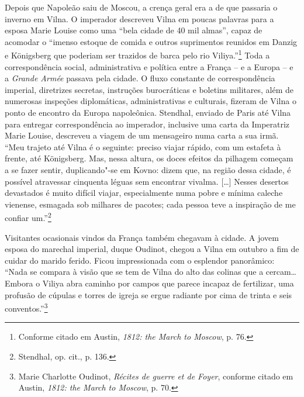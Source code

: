 Depois que Napoleão saiu de Moscou, a crença geral era a de que passaria
o inverno em Vilna. O imperador descreveu Vilna em poucas palavras para
a esposa Marie Louise como uma ``bela cidade de 40 mil almas'', capaz de
acomodar o ``imenso estoque de comida e outros suprimentos reunidos em
Danzig e Königsberg que poderiam ser trazidos de barca pelo
rio Viliya.''\footnote{Conforme citado em Austin, \textit{1812: the March to Moscow}, p. 76.} Toda a correspondência social, administrativa e política entre a França -- e a Europa -- e a \textit{Grande
Armée} passava pela cidade. O fluxo constante de correspondência
imperial, diretrizes secretas, instruções burocráticas e boletins
militares, além de numerosas inspeções diplomáticas, administrativas e
culturais, fizeram de Vilna o ponto de encontro da Europa napoleônica.
Stendhal, enviado de Paris até Vilna para entregar correspondência ao
imperador, inclusive uma carta da Imperatriz Marie Louise, descreveu a
viagem de um mensageiro numa carta a sua irmã. ``Meu trajeto até Vilna é
o seguinte: preciso viajar rápido, com um estafeta à frente, até
Königsberg. Mas, nessa altura, os doces efeitos da pilhagem começam a se
fazer sentir, duplicando"-se em Kovno: dizem que, na região dessa cidade,
é possível atravessar cinquenta léguas sem encontrar vivalma. [\ldots{}]
Nesses desertos devastados é muito difícil viajar, especialmente numa
pobre e mínima caleche vienense, esmagada sob milhares de pacotes; cada
pessoa teve a inspiração de me confiar um.''\footnote{Stendhal, op. cit., p. 136.}

Visitantes ocasionais vindos da França também chegavam à cidade. A jovem
esposa do marechal imperial, duque Oudinot, chegou a Vilna em outubro a
fim de cuidar do marido ferido. Ficou impressionada com o esplendor
panorâmico: ``Nada se compara à visão que se tem de Vilna do alto das
colinas que a cercam\ldots{} Embora o Viliya abra caminho por campos que
parece incapaz de fertilizar, uma profusão de cúpulas e torres de igreja
se ergue radiante por cima de trinta e seis conventos.''\footnote{Marie Charlotte Oudinot, \textit{Récites de guerre et de Foyer}, conforme citado em Austin, \textit{1812: the March to Moscow}, p. 70.}

